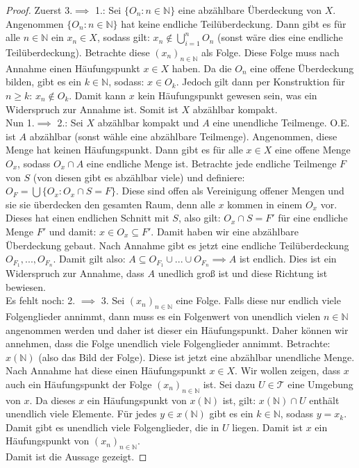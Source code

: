 \documentclass[11pt]{scrartcl}
\begin{document}
\begin{proof}
	Zuerst 3.$\implies$ 1.: Sei $\{O_n: n\in\mathbb N\}$ eine abzählbare Überdeckung von $X$. Angenommen $\{O_n: n\in\mathbb N\}$ hat keine endliche Teilüberdeckung. 
	Dann gibt es für alle $n\in\mathbb N$ ein $x_n \in X$, sodass gilt: $x_n\notin \bigcup_{i=1}^n O_n$ (sonst wäre dies eine endliche Teilüberdeckung). Betrachte diese $(x_n)_{n\in\mathbb N}$ als Folge. 
	Diese Folge muss nach Annahme einen Häufungspunkt $x\in X$ haben. Da die $O_n$ eine offene Überdeckung bilden, gibt es ein $k\in\mathbb N$, sodass: $x\in O_k$. 
	Jedoch gilt dann per Konstruktion für $n\geq k$: $x_n\notin O_k$. Damit kann $x$ kein Häufungspunkt gewesen sein, was ein Widerspruch zur Annahme ist. Somit ist $X$ abzählbar kompakt.\\
	Nun 1.$\implies$ 2.: Sei $X$ abzählbar kompakt und $A$ eine unendliche Teilmenge. O.E. ist $A$ abzählbar (sonst wähle eine abzählbare Teilmenge). Angenommen, diese Menge hat keinen Häufungspunkt. 
	Dann gibt es für alle $x\in X$ eine offene Menge $O_x$, sodass $O_x \cap A$ eine endliche Menge ist. Betrachte jede endliche Teilmenge $F$ von $S$ (von diesen gibt es abzählbar viele) und
	definiere: $O_F = \bigcup \{ O_x : O_x \cap S = F\}$. Diese sind offen als Vereinigung offener Mengen und sie sie überdecken den gesamten Raum, denn alle $x$ kommen in einem $O_x$ vor. Dieses hat 
	einen endlichen Schnitt mit $S$, also gilt: $O_x \cap S = F'$ für eine endliche Menge $F'$ und damit: $x\in O_x \subseteq F'$. Damit haben wir eine abzählbare Überdeckung gebaut. Nach Annahme
	gibt es jetzt eine endliche Teilüberdeckung $O_{F_1},..., O_{F_n}$. Damit gilt also: $A \subseteq O_{F_1} \cup ... \cup O_{F_n} \implies A$ ist endlich. Dies ist ein Widerspruch zur Annahme, dass $A$
	unedlich groß ist und diese Richtung ist bewiesen.\\
	Es fehlt noch: 2. $\implies$ 3. Sei $(x_n)_{n\in\mathbb N}$ eine Folge. Falls diese nur endlich viele Folgenglieder annimmt, dann muss es ein Folgenwert von unendlich vielen $n\in\mathbb N$ angenommen
	werden und daher ist dieser ein Häufungspunkt. Daher können wir annehmen, dass die Folge unendlich viele Folgenglieder annimmt. Betrachte: $x(\mathbb N)$ (also das Bild der Folge). Diese ist 
	jetzt eine abzählbar unendliche Menge. Nach Annahme hat diese einen Häufungspunkt $x\in X$. Wir wollen zeigen, dass $x$ auch ein Häufungspunkt der Folge $(x_n)_{n\in\mathbb N}$ ist. Sei dazu $U \in
	\mathcal T$ eine Umgebung von $x$. Da dieses $x$ ein Häufungspunkt von $x(\mathbb N)$ ist, gilt: $x(\mathbb N) \cap U$ enthält unendlich viele Elemente. Für jedes $y \in x(\mathbb N)$ gibt es ein
	$k\in\mathbb N$, sodass $y=x_k$. Damit gibt es unendlich viele Folgenglieder, die in $U$ liegen. Damit ist $x$ ein Häufungspunkt von $(x_n)_{n\in\mathbb N}$.\\
	Damit ist die Aussage gezeigt.
\end{proof}
\end{document}
